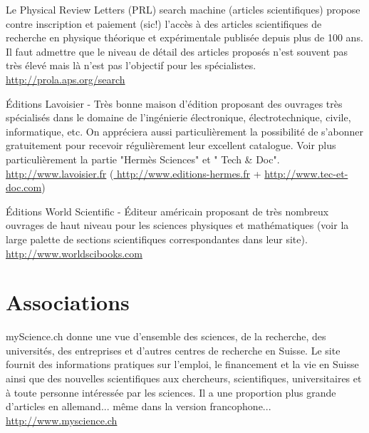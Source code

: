	{\Large {}}{\Large {}}{\Large {}}{\Large {}} Le Physical Review Letters (PRL) search machine (articles scientifiques) propose contre inscription et paiement (sic!) l'accès à des articles scientifiques de recherche en physique théorique et expérimentale publisée depuis plus de 100 ans. Il faut admettre que le niveau de détail des articles proposés n'est souvent pas très élevé mais là n'est pas l'objectif pour les spécialistes.\\
	\href{http://prola.aps.org/search}{\color{blue} http://prola.aps.org/search}
	
	\pagebreak
	{\Large {}}{\Large {}}{\Large {}} Éditions Lavoisier - Très bonne maison d'édition proposant des ouvrages très spécialisés dans le domaine de l'ingénierie électronique, électrotechnique, civile, informatique, etc. On appréciera aussi particulièrement la possibilité de s'abonner gratuitement pour recevoir régulièrement leur excellent catalogue. Voir plus particulièrement la partie "Hermès Sciences" et " Tech \& Doc".\\
	\href{http://www.lavoisier.fr}{\color{blue} http://www.lavoisier.fr} (\href{http://www.editions-hermes.fr}{\color{blue} http://www.editions-hermes.fr} + \href{http://www.tec-et-doc.com}{\color{blue} http://www.tec-et-doc.com})
	
	{\Large {}}{\Large {}}{\Large {}} Éditions World Scientific - Éditeur américain proposant de très nombreux ouvrages de haut niveau pour les sciences physiques et mathématiques (voir la large palette de sections scientifiques correspondantes dans leur site).\\
	\href{http://www.worldscibooks.com}{\color{blue}http://www.worldscibooks.com}
	
	\section{Associations}

		{\Large {}} myScience.ch donne une vue d'ensemble des sciences, de la recherche, des universités, des entreprises et d'autres centres de recherche en Suisse. Le site fournit des informations pratiques sur l'emploi, le financement et la vie en Suisse ainsi que des nouvelles scientifiques aux chercheurs, scientifiques, universitaires et à toute personne intéressée par les sciences. Il a une proportion plus grande d'articles en allemand... même dans la version francophone...\\
		\href{http://www.myscience.ch}{\color{blue}http://www.myscience.ch}
		
